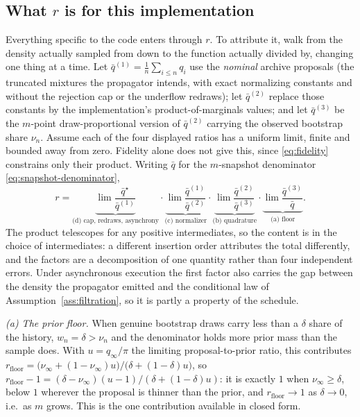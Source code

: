 \documentclass[pdflatex,sn-mathphys-num]{sn-jnl}
\theoremstyle{plain}
\theoremstyle{definition}
\begin{document}
\begin{appendices}
\subsection{What $r$ is for this implementation}\label{sec:theory-r}
Everything specific to the code enters through $r$. To attribute it, walk from the density actually sampled from down to the function actually divided by, changing one thing at a time. Let $\bar q^{(1)}=\tfrac1n\sum_{i\le n}q_i$ use the \emph{nominal} archive proposals (the truncated mixtures the propagator intends, with exact normalizing constants and without the rejection cap or the underflow redraws); let $\bar q^{(2)}$ replace those constants by the implementation's product-of-marginals values; and let $\bar q^{(3)}$ be the $m$-point draw-proportional version of $\bar q^{(2)}$ carrying the observed bootstrap share $\nu_n$. Assume each of the four displayed ratios has a uniform limit, finite and bounded away from zero. Fidelity alone does not give this, since \eqref{eq:fidelity} constrains only their product. Writing $\bar q$ for the $m$-snapshot denominator \eqref{eq:snapshot-denominator},
\[
r=\underbrace{\lim\frac{\bar q^\star}{\bar q^{(1)}}}_{\text{(d) cap, redraws, asynchrony}}\cdot
\underbrace{\lim\frac{\bar q^{(1)}}{\bar q^{(2)}}}_{\text{(c) normalizer}}\cdot
\underbrace{\lim\frac{\bar q^{(2)}}{\bar q^{(3)}}}_{\text{(b) quadrature}}\cdot
\underbrace{\lim\frac{\bar q^{(3)}}{\bar q}}_{\text{(a) floor}} .
\]
The product telescopes for any positive intermediates, so the content is in the choice of intermediates: a different insertion order attributes the total differently, and the factors are a decomposition of one quantity rather than four independent errors. Under asynchronous execution the first factor also carries the gap between the density the propagator emitted and the conditional law of Assumption~\ref{ass:filtration}, so it is partly a property of the schedule.

\emph{(a) The prior floor.} When genuine bootstrap draws carry less than a $\delta$ share of the history, $w_n=\delta>\nu_n$ and the denominator holds more prior mass than the sample does. With $u=q_\infty/\pi$ the limiting proposal-to-prior ratio, this contributes
$r_{\mathrm{floor}}=\bigl(\nu_\infty+(1-\nu_\infty)u\bigr)/\bigl(\delta+(1-\delta)u\bigr)$, so $r_{\mathrm{floor}}-1=(\delta-\nu_\infty)(u-1)/(\delta+(1-\delta)u)$: it is exactly $1$ when $\nu_\infty\ge\delta$, below $1$ wherever the proposal is thinner than the prior, and $r_{\mathrm{floor}}\to1$ as $\delta\to0$, i.e.\ as $m$ grows. This is the one contribution available in closed form.


\end{appendices}
\end{document}
